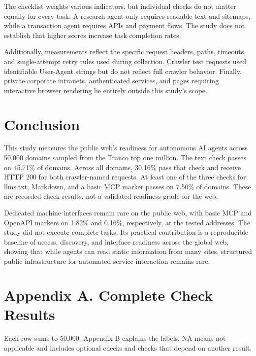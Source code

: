 \documentclass{article}
\begin{document}
The checklist weights various indicators, but individual checks do not matter equally for every task. A research agent only requires readable text and sitemaps, while a transaction agent requires APIs and payment flows. The study does not establish that higher scores increase task completion rates.

Additionally, measurements reflect the specific request headers, paths, timeouts, and single-attempt retry rules used during collection. Crawler test requests used identifiable User-Agent strings but do not reflect full crawler behavior. Finally, private corporate intranets, authenticated services, and pages requiring interactive browser rendering lie entirely outside this study's scope.

\section{Conclusion}

This study measures the public web's readiness for autonomous AI agents across 50,000 domains sampled from the Tranco top one million. The text check passes on 45.71\% of domains. Across all domains, 30.16\% pass that check and receive HTTP 200 for both crawler-named requests. At least one of the three checks for llms.txt, Markdown, and a basic MCP marker passes on 7.50\% of domains. These are recorded check results, not a validated readiness grade for the web.

Dedicated machine interfaces remain rare on the public web, with basic MCP and OpenAPI markers on 1.82\% and 0.16\%, respectively, at the tested addresses. The study did not execute complete tasks. Its practical contribution is a reproducible baseline of access, discovery, and interface readiness across the global web, showing that while agents can read static information from many sites, structured public infrastructure for automated service interaction remains rare.



\section*{Appendix A. Complete Check Results}

Each row sums to 50,000. Appendix B explains the labels. NA means not applicable and includes optional checks and checks that depend on another result.
\end{document}
